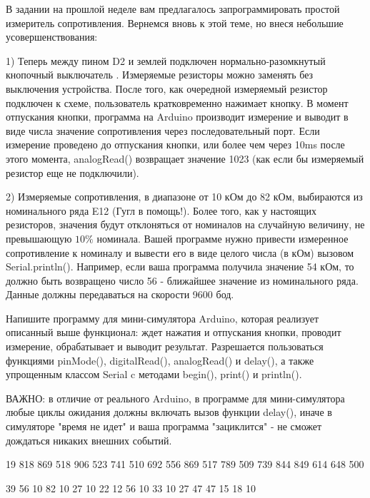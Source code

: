 
В задании на прошлой неделе вам предлагалось запрограммировать простой измеритель сопротивления.  
Вернемся вновь к этой теме, но внеся небольшие усовершенствования:  


1) Теперь между пином D2 и землей подключен нормально-разомкнутый кнопочный выключатель .  
Измеряемые резисторы можно заменять без выключения устройства.  После того, как очередной 
измеряемый резистор подключен к схеме, пользователь кратковременно нажимает кнопку. В момент 
отпускания кнопки, программа на Arduino производит измерение и выводит в виде числа значение 
сопротивления через последовательный порт.   Если измерение проведено до отпускания кнопки, 
или более чем через 10ms после этого момента,  analogRead() возвращает значение 1023 
(как если бы измеряемый резистор еще не подключили).  

2) Измеряемые сопротивления, в диапазоне от 10 кОм до 82 кОм, выбираются из номинального ряда E12 
(Гугл в помощь!). Более того, как у настоящих резисторов, значения будут отклоняться от 
номиналов на случайную величину, не превышающую $10\%$ номинала.  Вашей программе нужно привести 
измеренное сопротивление к номиналу и вывести его в виде целого числа (в кОм) вызовом Serial.println().  
Например, если ваша программа получила значение 54 кОм, то должно быть возвращено число 56 - ближайшее значение из номинального ряда.   Данные должны передаваться на скорости 9600 бод.

Напишите программу для мини-симулятора Arduino, которая реализует описанный выше функционал:  ждет нажатия и отпускания кнопки, проводит измерение, обрабатывает и выводит результат.  Разрешается пользоваться функциями pinMode(),  digitalRead(), analogRead() и delay(),  а также упрощенным классом Serial c методами begin(), print() и println().  

ВАЖНО: в отличие от реального Arduino, в программе для мини-симулятора любые циклы ожидания должны включать вызов функции delay(),  иначе в симуляторе "время не идет" и ваша программа  "зациклится" - не сможет дождаться никаких внешних событий.

\begin{myverbbox}[\small]{\vinput}
    19
    818
    869
    518
    906
    523
    741
    510
    692
    556
    869
    517
    789
    509
    739
    844
    849
    614
    648
    500
\end{myverbbox}

\begin{myverbbox}[\small]{\voutput}
    39
    56
    10
    82
    10
    27
    10
    22
    12
    56
    10
    33
    10
    27
    47
    47
    15
    18
    10
\end{myverbbox}
\outputTable

